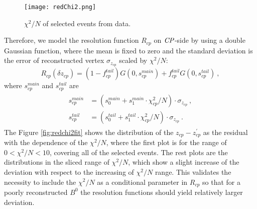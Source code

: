 \begin{figure}[htpb]
	\centering
	\texttt{[image: redChi2.png]}
	\caption{$\chi^2/N$ of selected events from data.}
	\label{fig:redchi2}
\end{figure}

Therefore, we model the resolution function $R_{cp}$ on $\it{CP}$-side by using a double Gaussian function, where the mean is fixed to zero and the standard deviation is the error of reconstructed vertex $\sigma_{z_{cp}}$ scaled by $\chi^2/N$:
\begin{equation}\label{eq:Rcp}
R_{cp}(\delta z_{cp}) = (1-f_{cp}^{tail})G(0,s_{cp}^{main})+
f_{cp}^{tail}G(0,s_{cp}^{tail})~,
\end{equation}
where $s_{cp}^{main}$ and $s_{cp}^{tail}$ are
\begin{eqnarray}\label{eq:scp_mt}
\begin{split}
s_{cp}^{main}&=(s_0^{main} + s_1^{main}\cdot \chi^2_{cp}/N )\cdot \sigma_{z_{cp}}~,\\
s_{cp}^{tail}&=(s_0^{tail} + s_1^{tail}\cdot \chi^2_{cp}/N )\cdot \sigma_{z_{cp}}~.
\end{split}
\end{eqnarray} 
The Figure \ref{fig:redchi2fit} shows the distribution of the $z_{cp}-z_{cp}^{'}$ as the residual with the dependence of the $\chi^2/N$, where the first plot is for the range of  $0<\chi^2/N<10$, covering all of the selected events. The rest plots are the distributions in the sliced range of $\chi^2/N$, which show a slight increase of the deviation with respect to the increasing of $\chi^2/N$ range. This validates the necessity to include the $\chi^2/N$ as a conditional parameter in $R_{cp}$ so that for a poorly reconstructed $B^0$ the resolution functions should yield relatively larger deviation.

